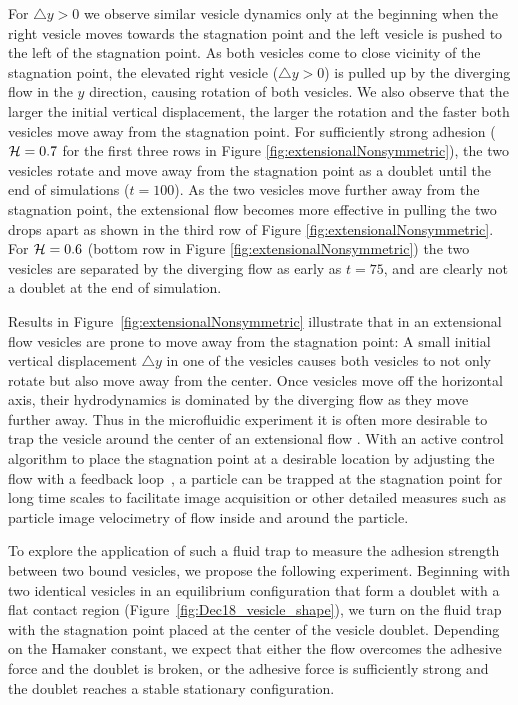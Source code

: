 \documentclass[prf,superscriptaddress,showkeys,longbibliography]{revtex4-1}
\begin{document}
For $\triangle y>0$ we observe similar vesicle dynamics only at the beginning 
when the right vesicle moves towards the stagnation point and the left vesicle is pushed to the left of the stagnation point. 
As both vesicles come to close vicinity of the stagnation point, the elevated right vesicle ($\triangle y >0$) is pulled up by the diverging flow in the $y$ direction,
causing rotation of both vesicles. 
We also observe that the larger the initial vertical displacement, the larger the rotation and the faster both vesicles move
away from the stagnation point.
%
For sufficiently strong adhesion (${\cal H}=0.7$ for the first three rows in Figure \ref{fig:extensionalNonsymmetric}),
 the two vesicles rotate and move away from the stagnation point as a doublet until the end of simulations ($t=100$).
As the two vesicles move further away from the stagnation point, the extensional flow becomes more effective in pulling the two drops apart
as shown in the third row of Figure \ref{fig:extensionalNonsymmetric}.
For ${\cal H}=0.6$ (bottom row in Figure \ref{fig:extensionalNonsymmetric})  
the two vesicles are separated by the diverging flow as early as $t=75$, and are clearly not a doublet at the end of simulation.



Results in Figure~\ref{fig:extensionalNonsymmetric} illustrate that
in an extensional flow vesicles are prone to move away from the stagnation point:
A small initial vertical displacement $\triangle y$ in one  of the vesicles causes both vesicles to not only rotate but also move away from the
center. Once vesicles move off the horizontal axis, their hydrodynamics is dominated by the diverging flow as they move further away.
Thus in the microfluidic experiment it is often more desirable to trap the vesicle around the center of an extensional flow \cite{Spjut2010_MSThesis_Chapter3}.
%
With an active
control algorithm to place the stagnation point at a desirable location
by adjusting the flow with a feedback
loop~\cite{BentleyLeal1986_JFMa,Johnson-Chavarria2011_EMJ}, a particle can be trapped at the
stagnation point for long time scales to facilitate image acquisition or
other detailed measures such as particle image velocimetry of flow
inside and around the particle.  

To explore the application of such a
fluid trap to measure the adhesion strength between two bound vesicles, 
we propose the following experiment.  
Beginning with two
identical vesicles in an equilibrium configuration that form a doublet
with a flat contact region (Figure~\ref{fig:Dec18_vesicle_shape}), we
turn on the fluid trap with the stagnation point placed at the center of
the vesicle doublet.  Depending on the Hamaker constant, we expect that
either the flow overcomes the adhesive force and the doublet is broken,
or the adhesive force is sufficiently strong and the doublet reaches a
stable stationary configuration.
\end{document}
